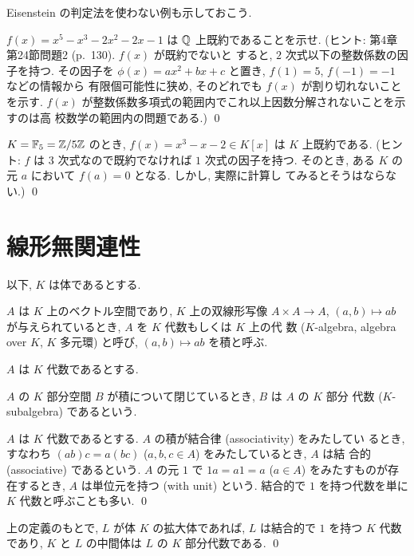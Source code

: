 \documentclass[12pt,twoside]{jarticle}
\begin{document}
Eisenstein の判定法を使わない例も示しておこう.

\begin{question}
  $f(x)=x^5-x^3-2x^2-2x-1$ は ${\mathbb Q}$ 上既約であることを示せ.
  (ヒント: \cite{takagi2} 第4章第24節問題2 (p.~130).  $f(x)$ が既約でないと
  すると, $2$ 次式以下の整数係数の因子を持つ. 
  その因子を $\phi(x)=ax^2+bx+c$ と置き, $f(1)=5$, $f(-1)=-1$ などの情報から
  有限個可能性に狭め, そのどれでも $f(x)$ が割り切れないことを示す.
  $f(x)$ が整数係数多項式の範囲内でこれ以上因数分解されないことを示すのは高
  校数学の範囲内の問題である.)
  \qed
\end{question}

\begin{question}
  $K={\mathbb F}_5={\mathbb Z}/5{\mathbb Z}$ のとき, $f(x)=x^3-x-2\in K[x]$ は $K$ 上既約である. 
  (ヒント: $f$ は $3$ 次式なので既約でなければ $1$ 次式の因子を持つ.
  そのとき, ある $K$ の元 $a$ において $f(a)=0$ となる. しかし, 実際に計算し
  てみるとそうはならない.) \qed
\end{question}


\section{線形無関連性}

以下, $K$ は体であるとする.

\begin{definition}[$K$ 代数]
  $A$ は $K$ 上のベクトル空間であり, $K$ 上の双線形写像 $A\times A\to A$,
  $(a,b)\mapsto ab$ が与えられているとき, $A$ を $K$ 代数もしくは $K$ 上の代
  数 ($K$-algebra, algebra over $K$, $K$ 多元環) と呼び, $(a,b)\mapsto ab$ 
  を積と呼ぶ.

  $A$ は $K$ 代数であるとする. 

  $A$ の $K$ 部分空間 $B$ が積について閉じているとき, $B$ は $A$ の $K$ 部分
  代数 ($K$-subalgebra) であるという. 

  $A$ は $K$ 代数であるとする. $A$ の積が結合律 (associativity) をみたしてい
  るとき, すなわち $(ab)c=a(bc)$ ($a,b,c\in A$) をみたしているとき, $A$ は結
  合的 (associative) であるという. 
  $A$ の元 $1$ で $1a=a1=a$ ($a\in A$) をみたすものが存在するとき, 
  $A$ は単位元を持つ (with unit) という.
  結合的で $1$ を持つ代数を単に $K$ 代数と呼ぶことも多い.
  \qed
\end{definition}

\begin{question}
  上の定義のもとで, $L$ が体 $K$ の拡大体であれば, 
  $L$ は結合的で $1$ を持つ $K$ 代数であり,
  $K$ と $L$ の中間体は $L$ の $K$ 部分代数である.  \qed
\end{question}
\end{document}
